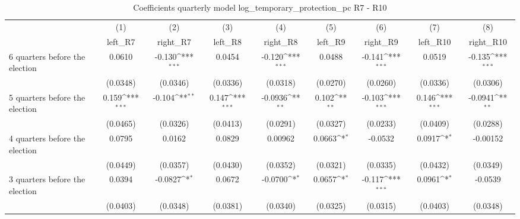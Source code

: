 \begin{table}[htbp]\centering
\def\sym#1{\ifmmode^{#1}\else\(^{#1}\)\fi}
\caption{Coefficients quarterly model log\_temporary\_protection\_pc R7 - R10}
\begin{tabular}{l*{8}{c}}
\hline\hline
                    &\multicolumn{1}{c}{(1)}&\multicolumn{1}{c}{(2)}&\multicolumn{1}{c}{(3)}&\multicolumn{1}{c}{(4)}&\multicolumn{1}{c}{(5)}&\multicolumn{1}{c}{(6)}&\multicolumn{1}{c}{(7)}&\multicolumn{1}{c}{(8)}\\
                    &\multicolumn{1}{c}{left\_R7}&\multicolumn{1}{c}{right\_R7}&\multicolumn{1}{c}{left\_R8}&\multicolumn{1}{c}{right\_R8}&\multicolumn{1}{c}{left\_R9}&\multicolumn{1}{c}{right\_R9}&\multicolumn{1}{c}{left\_R10}&\multicolumn{1}{c}{right\_R10}\\
\hline
 6 quarters before the election&      0.0610         &      -0.130\sym{***}&      0.0454         &      -0.120\sym{***}&      0.0488         &      -0.141\sym{***}&      0.0519         &      -0.135\sym{***}\\
                    &    (0.0348)         &    (0.0346)         &    (0.0336)         &    (0.0318)         &    (0.0270)         &    (0.0260)         &    (0.0336)         &    (0.0306)         \\
[1em]
 5 quarters before the election&       0.159\sym{***}&      -0.104\sym{**} &       0.147\sym{***}&     -0.0936\sym{**} &       0.102\sym{**} &      -0.103\sym{***}&       0.146\sym{***}&     -0.0941\sym{**} \\
                    &    (0.0465)         &    (0.0326)         &    (0.0413)         &    (0.0291)         &    (0.0327)         &    (0.0233)         &    (0.0409)         &    (0.0288)         \\
[1em]
 4 quarters before the election&      0.0795         &      0.0162         &      0.0829         &     0.00962         &      0.0663\sym{*}  &     -0.0532         &      0.0917\sym{*}  &    -0.00152         \\
                    &    (0.0449)         &    (0.0357)         &    (0.0430)         &    (0.0352)         &    (0.0321)         &    (0.0335)         &    (0.0432)         &    (0.0349)         \\
[1em]
 3 quarters before the election&      0.0394         &     -0.0827\sym{*}  &      0.0672         &     -0.0700\sym{*}  &      0.0657\sym{*}  &      -0.117\sym{***}&      0.0961\sym{*}  &     -0.0539         \\
                    &    (0.0403)         &    (0.0348)         &    (0.0381)         &    (0.0340)         &    (0.0325)         &    (0.0315)         &    (0.0403)         &    (0.0348)         \\

\end{tabular}
\end{table}
